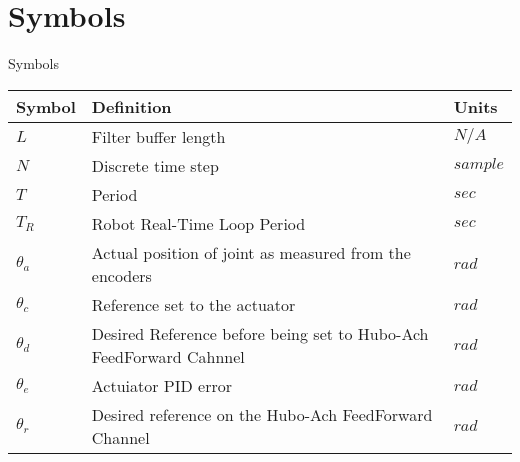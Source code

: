 \chapter{Symbols}
\Large
\centering
Symbols\\
\normalsize
\begin{longtable}{p{} | p{} | p{}}
\hline
Symbol     & Definition                                                         & Units \\
\hline
$L$        & Filter buffer length                                               & $N/A$\\
\hline
$N$        & Discrete time step                                                 & $sample$\\
\hline
$T$        & Period                                                             & $sec$ \\
\hline
$T_R$        & Robot Real-Time Loop Period                                      & $sec$ \\
\hline
$\theta_a$ & Actual position of joint as measured from the encoders             & $rad$ \\
\hline
$\theta_c$ & Reference set to the actuator                                      & $rad$ \\
\hline
$\theta_d$ & Desired Reference before being set to Hubo-Ach FeedForward Cahnnel & $rad$ \\
\hline
$\theta_e$ & Actuiator PID error                                                & $rad$ \\
\hline
$\theta_r$ & Desired reference on the Hubo-Ach FeedForward Channel              & $rad$ \\
\hline

\end{longtable}
